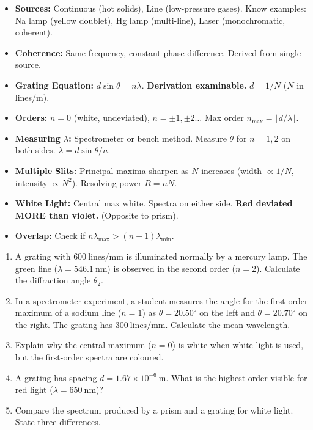 \documentclass[11pt]{article}
\begin{document}
\begin{aretenir}
\begin{itemize}
    \item \textbf{Sources:} Continuous (hot solids), Line (low-pressure gases). Know examples: Na lamp (yellow doublet), Hg lamp (multi-line), Laser (monochromatic, coherent).
    \item \textbf{Coherence:} Same frequency, constant phase difference. Derived from single source.
    \item \textbf{Grating Equation:} $d\sin\theta = n\lambda$. \textbf{Derivation examinable.} $d = 1/N$ ($N$ in lines/m).
    \item \textbf{Orders:} $n=0$ (white, undeviated), $n=\pm 1, \pm 2\dots$ Max order $n_{\max} = \lfloor d/\lambda \rfloor$.
    \item \textbf{Measuring $\lambda$:} Spectrometer or bench method. Measure $\theta$ for $n=1,2$ on both sides. $\lambda = d\sin\theta/n$.
    \item \textbf{Multiple Slits:} Principal maxima sharpen as $N$ increases (width $\propto 1/N$, intensity $\propto N^2$). Resolving power $R = nN$.
    \item \textbf{White Light:} Central max white. Spectra on either side. \textbf{Red deviated MORE than violet.} (Opposite to prism).
    \item \textbf{Overlap:} Check if $n\lambda_{\max} > (n+1)\lambda_{\min}$.
\end{itemize}
\end{aretenir}

\begin{exercice}
\begin{enumerate}
    \item A grating with $600\ \mathrm{lines/mm}$ is illuminated normally by a mercury lamp. The green line ($\lambda = 546.1\ \mathrm{nm}$) is observed in the second order ($n=2$). Calculate the diffraction angle $\theta_2$.
    \item In a spectrometer experiment, a student measures the angle for the first-order maximum of a sodium line ($n=1$) as $\theta = 20.50^\circ$ on the left and $\theta = 20.70^\circ$ on the right. The grating has $300\ \mathrm{lines/mm}$. Calculate the mean wavelength.
    \item Explain why the central maximum ($n=0$) is white when white light is used, but the first-order spectra are coloured.
    \item A grating has spacing $d = 1.67 \times 10^{-6}\ \mathrm{m}$. What is the highest order visible for red light ($\lambda = 650\ \mathrm{nm}$)?
    \item Compare the spectrum produced by a prism and a grating for white light. State three differences.
\end{enumerate}
\end{exercice}
\end{document}
